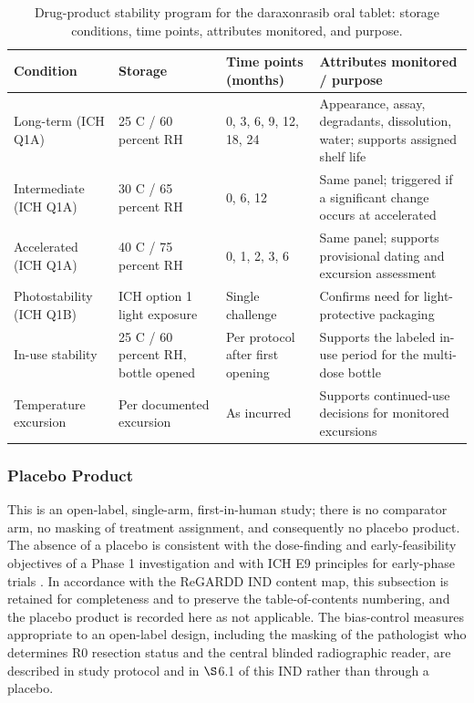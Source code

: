 \begin{table}[t]
\centering
\caption{Drug-product stability program for the daraxonrasib oral tablet:
storage conditions, time points, attributes monitored, and purpose.}
\label{tab:cmc-stability}
\begin{tabularx}{\textwidth}{L{2.3cm} L{3.5cm} L{3.9cm} Y}
\toprule
\textbf{Condition} & \textbf{Storage} & \textbf{Time points (months)} & \textbf{Attributes monitored / purpose} \\
\midrule
Long-term (ICH Q1A) & 25 C / 60 percent RH & 0, 3, 6, 9, 12, 18, 24 & Appearance, assay, degradants, dissolution, water; supports assigned shelf life \\
Intermediate (ICH Q1A) & 30 C / 65 percent RH & 0, 6, 12 & Same panel; triggered if a significant change occurs at accelerated \\
Accelerated (ICH Q1A) & 40 C / 75 percent RH & 0, 1, 2, 3, 6 & Same panel; supports provisional dating and excursion assessment \\
Photostability (ICH Q1B) & ICH option 1 light exposure & Single challenge & Confirms need for light-protective packaging \\
In-use stability & 25 C / 60 percent RH, bottle opened & Per protocol after first opening & Supports the labeled in-use period for the multi-dose bottle \\
Temperature excursion & Per documented excursion & As incurred & Supports continued-use decisions for monitored excursions \\
\bottomrule
\end{tabularx}
\vspace*{-0.2cm}
\end{table}

\subsubsection{Placebo Product}

This is an open-label, single-arm, first-in-human study; there is no comparator
arm, no masking of treatment assignment, and consequently no placebo product. The
absence of a placebo is consistent with the dose-finding and early-feasibility
objectives of a Phase 1 investigation and with ICH E9 principles for early-phase
trials \cite{ichpaistduni,phase1guidance}. In accordance with the ReGARDD IND
content map, this subsection is retained for completeness and to preserve the
table-of-contents numbering, and the placebo product is recorded here as not
applicable. The bias-control measures appropriate to an open-label design,
including the masking of the pathologist who determines R0 resection status and
the central blinded radiographic reader, are described in study protocol and
in $\S$6.1 of this IND rather than through a placebo. 

